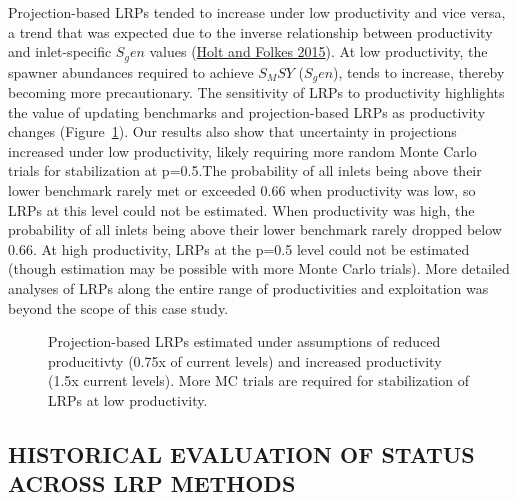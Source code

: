 \documentclass[11pt]{book}
\begin{document}
Projection-based LRPs tended to increase under low productivity and vice versa, a trend that was expected due to the inverse relationship between productivity and inlet-specific \(S_gen\) values (\protect\hyperlink{ref-holtCautionsUsingPercentilebased2015}{Holt and Folkes 2015}). At low productivity, the spawner abundances required to achieve \(S_MSY\) (\(S_gen\)), tends to increase, thereby becoming more precautionary. The sensitivity of LRPs to productivity highlights the value of updating benchmarks and projection-based LRPs as productivity changes (Figure~\ref{fig:chinook-projLRPsAlpha}). Our results also show that uncertainty in projections increased under low productivity, likely requiring more random Monte Carlo trials for stabilization at p=0.5.The probability of all inlets being above their lower benchmark rarely met or exceeded 0.66 when productivity was low, so LRPs at this level could not be estimated. When productivity was high, the probability of all inlets being above their lower benchmark rarely dropped below 0.66. At high productivity, LRPs at the p=0.5 level could not be estimated (though estimation may be possible with more Monte Carlo trials). More detailed analyses of LRPs along the entire range of productivities and exploitation was beyond the scope of this case study.
\begin{figure}[htb]

{\centering {} 

}

\caption{Projection-based LRPs estimated under assumptions of reduced producitivty (0.75x of current levels) and increased productivity (1.5x current levels). More MC trials are required for stabilization of LRPs at low productivity.}\label{fig:chinook-projLRPsAlpha}
\end{figure}
\hypertarget{historical-evaluation-of-status-across-lrp-methods-1}{%
\subsection{HISTORICAL EVALUATION OF STATUS ACROSS LRP METHODS}\label{historical-evaluation-of-status-across-lrp-methods-1}}
\end{document}
